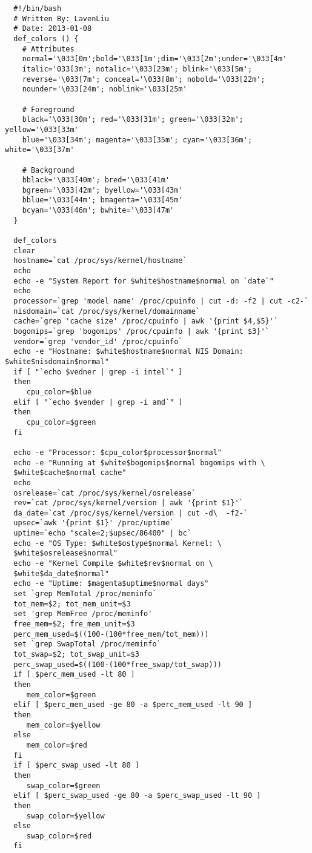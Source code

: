 \begin{lstlisting}
  #!/bin/bash
  # Written By: LavenLiu
  # Date: 2013-01-08
  def_colors () {
    # Attributes
    normal='\033[0m';bold='\033[1m';dim='\033[2m';under='\033[4m'
    italic='033[3m'; notalic='\033[23m'; blink='\033[5m';
    reverse='\033[7m'; conceal='\033[8m'; nobold='\033[22m';
    nounder='\033[24m'; noblink='\033[25m'
    
    # Foreground
    black='\033[30m'; red='\033[31m'; green='\033[32m'; yellow='\033[33m'
    blue='\033[34m'; magenta='\033[35m'; cyan='\033[36m'; white='\033[37m'

    # Background
    bblack='\033[40m'; bred='\033[41m'
    bgreen='\033[42m'; byellow='\033[43m'
    bblue='\033[44m'; bmagenta='\033[45m'
    bcyan='\033[46m'; bwhite='\033[47m'
  }

  def_colors
  clear
  hostname=`cat /proc/sys/kernel/hostname`
  echo
  echo -e "System Report for $white$hostname$normal on `date`"
  echo
  processor=`grep 'model name' /proc/cpuinfo | cut -d: -f2 | cut -c2-`
  nisdomain=`cat /proc/sys/kernel/domainname`
  cache=`grep 'cache size' /proc/cpuinfo | awk '{print $4,$5}'`
  bogomips=`grep 'bogomips' /proc/cpuinfo | awk '{print $3}'`
  vendor=`grep 'vendor_id' /proc/cpuinfo`
  echo -e "Hostname: $white$hostname$normal NIS Domain: $white$nisdomain$normal"
  if [ "`echo $vedner | grep -i intel`" ]
  then
     cpu_color=$blue
  elif [ "`echo $vender | grep -i amd`" ]
  then
     cpu_color=$green
  fi
  
  echo -e "Processor: $cpu_color$processor$normal"
  echo -e "Running at $white$bogomips$normal bogomips with \
  $white$cache$normal cache"
  echo
  osrelease=`cat /proc/sys/kernel/osrelease`
  rev=`cat /proc/sys/kernel/version | awk '{print $1}'`
  da_date=`cat /proc/sys/kernel/version | cut -d\  -f2-`
  upsec=`awk '{print $1}' /proc/uptime`
  uptime=`echo "scale=2;$upsec/86400" | bc`
  echo -e "OS Type: $white$ostype$normal Kernel: \
  $white$osrelease$normal"
  echo -e "Kernel Compile $white$rev$normal on \
  $white$da_date$normal"
  echo -e "Uptime: $magenta$uptime$normal days"
  set `grep MemTotal /proc/meminfo`
  tot_mem=$2; tot_mem_unit=$3
  set 'grep MemFree /proc/meminfo'
  free_mem=$2; fre_mem_unit=$3
  perc_mem_used=$((100-(100*free_mem/tot_mem)))
  set `grep SwapTotal /proc/meminfo`
  tot_swap=$2; tot_swap_unit=$3
  perc_swap_used=$((100-(100*free_swap/tot_swap)))
  if [ $perc_mem_used -lt 80 ]
  then
     mem_color=$green
  elif [ $perc_mem_used -ge 80 -a $perc_mem_used -lt 90 ]
  then
     mem_color=$yellow
  else
     mem_color=$red
  fi
  if [ $perc_swap_used -lt 80 ]
  then
     swap_color=$green
  elif [ $perc_swap_used -ge 80 -a $perc_swap_used -lt 90 ]
  then
     swap_color=$yellow
  else
     swap_color=$red
  fi
  

\end{lstlisting}
